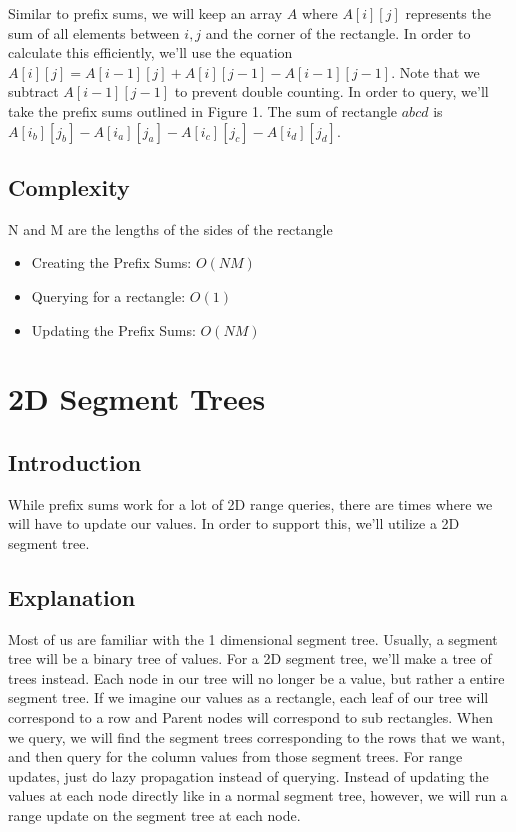 \documentclass{article}
\begin{document}
    \hspace{1em} \quad Similar to prefix sums, we will keep an array $A$ where $A[i][j]$ represents the sum of all elements between $i, j$ and the corner of the rectangle. In order to calculate this efficiently, we'll use the equation $A[i][j] = A[i-1][j] + A[i][j-1] - A[i-1][j-1]$. Note that we subtract $A[i-1][j-1]$ to prevent double counting. In order to query, we'll take the prefix sums outlined in Figure 1. The sum of rectangle $abcd$ is $A[i_b][j_b] - A[i_a][j_a] - A[i_c][j_c] - A[i_d][j_d]$.
    
    \subsection{Complexity}
    N and M are the lengths of the sides of the rectangle
    \begin{itemize}
      \item Creating the Prefix Sums: $O(NM)$
      \item Querying for a rectangle: $O(1)$
      \item Updating the Prefix Sums: $O(NM)$
    \end{itemize}
    
\section{2D Segment Trees}
    \subsection{Introduction}
    \hspace{1em} \quad While prefix sums work for a lot of 2D range queries, there are times where we will have to update our values. In order to support this, we'll utilize a 2D segment tree.
    
    \subsection{Explanation}
    \hspace{1em} \quad Most of us are familiar with the 1 dimensional segment tree. Usually, a segment tree will be a binary tree of values. For a 2D segment tree, we'll make a tree of trees instead. Each node in our tree will no longer be a value, but rather a entire segment tree. If we imagine our values as a rectangle, each leaf of our tree will correspond to a row and Parent nodes will correspond to sub rectangles. When we query, we will find the segment trees corresponding to the rows that we want, and then query for the column values from those segment trees. For range updates, just do lazy propagation instead of querying. Instead of updating the values at each node directly like in a normal segment tree, however, we will run a range update on the segment tree at each node.
    
\end{document}
